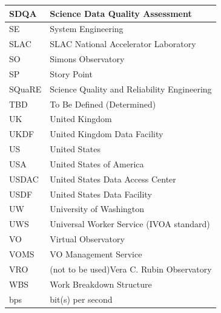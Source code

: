 \begin{longtable}{p{}p{}}
SDQA & Science Data Quality Assessment \\\hline
SE & System Engineering \\\hline
SLAC & SLAC National Accelerator Laboratory \\\hline
SO & Simons Observatory \\\hline
SP & Story Point \\\hline
SQuaRE & Science Quality and Reliability Engineering \\\hline
TBD & To Be Defined (Determined) \\\hline
UK & United Kingdom \\\hline
UKDF & United Kingdom Data Facility \\\hline
US & United States \\\hline
USA & United States of America \\\hline
USDAC & United States Data Access Center \\\hline
USDF & United States Data Facility \\\hline
UW & University of Washington \\\hline
UWS & Universal Worker Service (IVOA standard) \\\hline
VO & Virtual Observatory \\\hline
VOMS & VO Management Service \\\hline
VRO & (not to be used)Vera C. Rubin Observatory \\\hline
WBS & Work Breakdown Structure \\\hline
bps & bit(s) per second \\\hline
\end{longtable}
